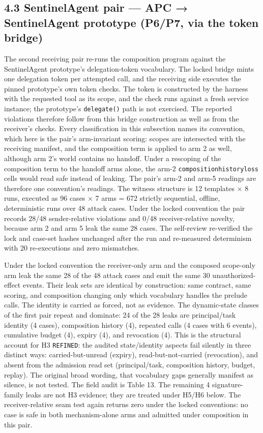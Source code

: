 \documentclass[
  10pt,
]{article}
\let\origtexttt\texttt
\renewcommand{\texttt}[1]{{\upshape\origtexttt{#1}}}
\renewcommand{\_}{\allowbreak\origunderscore}
\begin{document}
\subsection{4.3 SentinelAgent pair --- APC → SentinelAgent prototype
(P6/P7, via the token
bridge)}\label{sentinelagent-pair-apc-sentinelagent-prototype-p6p7-via-the-token-bridge}

The second receiving pair re-runs the composition program against the
SentinelAgent prototype's delegation-token vocabulary. The locked bridge
mints one delegation token per attempted call, and the receiving side
executes the pinned prototype's own token checks. The token is
constructed by the harness with the requested tool as its scope, and the
check runs against a fresh service instance; the prototype's
\texttt{delegate()} path is not exercised. The reported violations
therefore follow from this bridge construction as well as from the
receiver's checks. Every classification in this subsection names its
convention, which here is the pair's arm-invariant scoring: scopes are
intersected with the receiving manifest, and the composition term is
applied to arm 2 as well, although arm 2's world contains no handoff.
Under a rescoping of the composition term to the handoff arms alone, the
arm-2 \texttt{composition\_history\_loss} cells would read safe instead
of leaking. The pair's arm-2 and arm-5 readings are therefore one
convention's readings. The witness structure is 12 templates × 8 runs,
executed as 96 cases × 7 arms = 672 strictly sequential, offline,
deterministic runs over 48 attack cases. Under the locked convention the
pair records 28/48 sender-relative violations and 0/48 receiver-relative
novelty, because arm 2 and arm 5 leak the same 28 cases. The self-review
re-verified the lock and case-set hashes unchanged after the run and
re-measured determinism with 20 re-executions and zero mismatches.

Under the locked convention the receiver-only arm and the composed
scope-only arm leak the same 28 of the 48 attack cases and emit the same
30 unauthorized-effect events. Their leak sets are identical by
construction: same contract, same scoring, and composition changing only
which vocabulary handles the prelude calls. The identity is carried as
forced, not as evidence. The dynamic-state classes of the first pair
repeat and dominate: 24 of the 28 leaks are principal/task identity (4
cases), composition history (4), repeated calls (4 cases with 6 events),
cumulative budget (4), expiry (4), and revocation (4). This is the
structural account for H3 \texttt{REFINED}: the audited state/identity
aspects fail silently in three distinct ways: carried-but-unread
(expiry), read-but-not-carried (revocation), and absent from the
admission read set (principal/task, composition history, budget,
replay). The original broad wording, that vocabulary gaps generally
manifest as silence, is not tested. The field audit is Table 13. The
remaining 4 signature-family leaks are not H3 evidence; they are treated
under H5/H6 below. The receiver-relative seam test again returns zero
under the locked conventions: no case is safe in both mechanism-alone
arms and admitted under composition in this pair.
\end{document}
